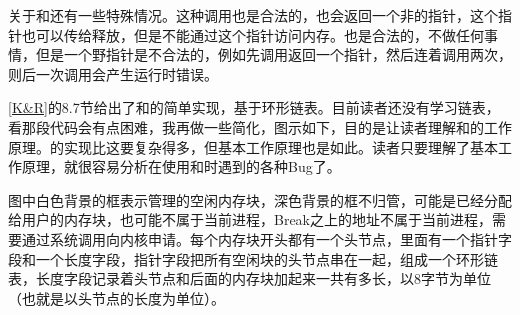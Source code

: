 关于和还有一些特殊情况。这种调用也是合法的，也会返回一个非的指针，这个指针也可以传给释放，但是不能通过这个指针访问内存。也是合法的，不做任何事情，但是一个野指针是不合法的，例如先调用返回一个指针，然后连着调用两次，则后一次调用会产生运行时错误。



\hyperlink{db.bi01.bibli.kr}{[K\&R]}的8.\BookSplit{}7节给出了和的简单实现，基于环形链表。目前读者还没有学习链表，看那段代码会有点困难，我再做一些简化，图示如下，目的是让读者理解和的工作原理。的实现比这要复杂得多，但基本工作原理也是如此。读者只要理解了基本工作原理，就很容易分析在使用和时遇到的各种Bug了。




图中白色背景的框表示管理的空闲内存块，深色背景的框不归管，可能是已经分配给用户的内存块，也可能不属于当前进程，Break之上的地址不属于当前进程，需要通过系统调用向内核申请。每个内存块开头都有一个头节点，里面有一个指针字段和一个长度字段，指针字段把所有空闲块的头节点串在一起，组成一个环形链表，长度字段记录着头节点和后面的内存块加起来一共有多长，以8字节为单位（也就是以头节点的长度为单位）。


